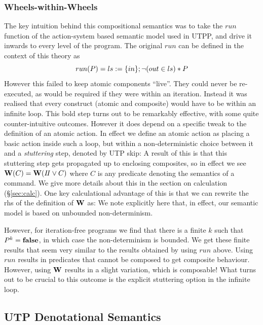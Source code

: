 \subsubsection{Wheels-within-Wheels}

The key intuition behind this compositional semantics was to take the
$run$ function of the action-system based semantic model used in UTPP,
and drive it inwards to every level of the program.
The original $run$ can be defined in the context of this theory as
\[
  run(P) = ls := \{in\} ; \lnot (out \in ls) * P
\]
However this failed to keep atomic components ``live''.
They could never be re-executed,
as would be required if they were within an iteration.
Instead it was realised that every construct (atomic and composite)
would have to be within an infinite loop.
This bold step turns out to be remarkably effective,
with some quite counter-intuitive outcomes.
However it does depend on a specific tweak to the
definition of an atomic action.
In effect we define an atomic action
as placing a basic action inside such a loop,
but within a non-deterministic choice between it
and a \emph{stuttering} step, denoted by UTP skip:
A result of this is that this stuttering step gets
propagated up to enclosing composites,
so in effect we see $\mathbf{W}(C)=\mathbf{W}(I\!I\lor C)$
where $C$ is any predicate denoting the semantics of a command.
We give more details about this in the section on calculation (\S\ref{sec:calc}).
One key calculational advantage of this is that we can rewrite
the rhs of the definition of $\mathbf{W}$ as:
%
We note explicitly here that, in effect,
our semantic model is based on unbounded non-determinism.

However, for iteration-free programs
we find that there is a finite $k$ such that $P^k = \mathbf{false}$,
in which case the non-determinism is bounded.
We get these finite results that seem very similar
to the results obtained by using $run$ above.
Using $run$ results in predicates that cannot be composed
to get composite behaviour.
However, using $\mathbf{W}$ results in a slight variation,
which is composable!
What turns out to be crucial
to this outcome is the explicit stuttering option in the infinite loop.

\subsection{UTP Denotational Semantics}

